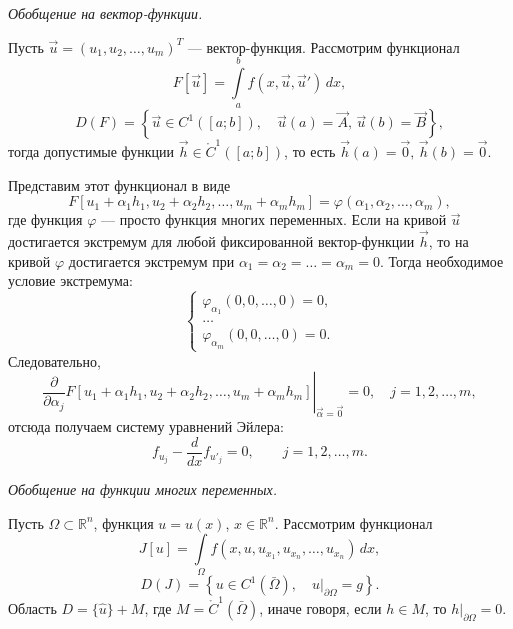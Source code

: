 \documentclass[12pt,a5paper]{book}
\begin{document}
	\vspace*{1em}
	\emph{Обобщение на вектор-функции.}
	
	\noindent Пусть $\vec{u} = (u_1, u_2, \dots, u_m)^T$ --- вектор-функция. Рассмотрим функционал
	\begin{equation*}
		F[\vec{u}] = \int\limits_a^b f\left(x, \vec{u}, \vec{u}'\right)\,dx,
	\end{equation*}
	\begin{equation*}
		D(F) = \left\{\vec{u} \in C^1([a;b]), \quad \vec{u}(a) = \vec{A},\, \vec{u}(b) = \vec{B}\right\},
	\end{equation*}
	тогда допустимые функции $\vec{h} \in \mathring{C}^1([a;b])$, то есть $\vec{h}(a) = \vec{0},\, \vec{h}(b) = \vec{0}$.
	
	Представим этот функционал в виде
	\begin{equation*}
		F[u_1 + \alpha_1h_1, u_2 + \alpha_2h_2, \dots, u_m + \alpha_mh_m] = \varphi(\alpha_1, \alpha_2, \dots, \alpha_m),
	\end{equation*}
	где функция $\varphi$ --- просто функция многих переменных. Если на кривой $\vec{u}$ достигается экстремум для любой фиксированной вектор-функции $\vec{h}$, то на кривой $\varphi$ достигается экстремум при $\alpha_1 = \alpha_2 = \dots = \alpha_m = 0$. Тогда необходимое условие экстремума:
	\begin{equation*}
		\begin{cases}
			\varphi_{\alpha_1}(0,0,\dots,0) = 0, \\
			\dots \\
			\varphi_{\alpha_m}(0,0,\dots,0) = 0.
		\end{cases}
	\end{equation*}
	Следовательно, 
	\begin{equation*}
		\left.\frac{\partial}{\partial\alpha_j}F[u_1 + \alpha_1h_1, u_2 + \alpha_2h_2, \dots, u_m + \alpha_mh_m]\right|_{\vec{\alpha}=\vec{0}} = 0, \quad j = 1, 2, \dots, m,
	\end{equation*}
	отсюда получаем систему уравнений Эйлера:
	\begin{equation*}
		f_{u_j} - \frac{d}{dx}f_{u'_j} = 0, \qquad j = 1, 2, \dots, m.
	\end{equation*}
	
	\emph{Обобщение на функции многих переменных.}
	
	\noindent Пусть $\Omega \subset \mathbb{R}^n$, функция $u = u(x)$, $x \in \mathbb{R}^n$. Рассмотрим функционал
	\begin{equation*}
		J[u] = \int\limits_\Omega f(x, u, u_{x_1}, u_{x_n}, \dots, u_{x_n})\,dx,
	\end{equation*}
	\begin{equation*}
		D(J) = \left\{u \in C^1(\bar{\Omega}), \quad \left.u\right|_{\partial\Omega} = g\right\}.
	\end{equation*}
	Область $D =\{\hat{u}\} + M$, где $M = \mathring{C}^1(\bar{\Omega})$, иначе говоря, если $h \in M$, то $h|_{\partial\Omega} = 0$.
	
\end{document}
